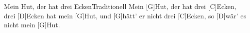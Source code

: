 \documentclass[../main.tex]{subfiles}
\begin{document}
\begin{songwithoutpagebreak}{Mein Hut, der hat drei Ecken}{Traditionell}{}
Mein [G]Hut, der hat drei [C]Ecken, drei [D]Ecken hat mein [G]Hut,
und [G]hätt' er nicht drei [C]Ecken, so [D]wär' es nicht mein [G]Hut.
\end{songwithoutpagebreak}
\end{document}
